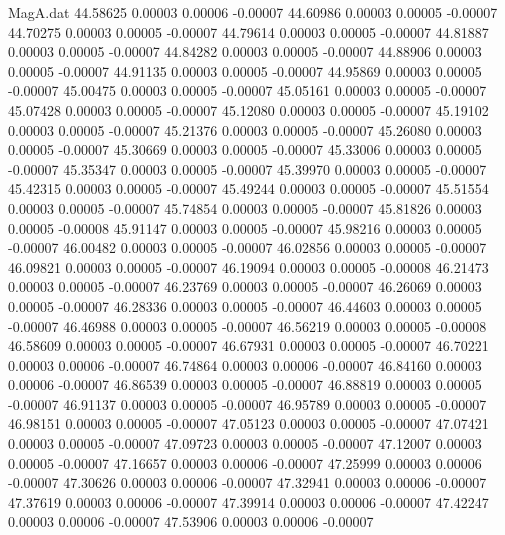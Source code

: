 \begin{filecontents}{MagA.dat}
  44.58625    0.00003    0.00006   -0.00007
  44.60986    0.00003    0.00005   -0.00007
  44.70275    0.00003    0.00005   -0.00007
  44.79614    0.00003    0.00005   -0.00007
  44.81887    0.00003    0.00005   -0.00007
  44.84282    0.00003    0.00005   -0.00007
  44.88906    0.00003    0.00005   -0.00007
  44.91135    0.00003    0.00005   -0.00007
  44.95869    0.00003    0.00005   -0.00007
  45.00475    0.00003    0.00005   -0.00007
  45.05161    0.00003    0.00005   -0.00007
  45.07428    0.00003    0.00005   -0.00007
  45.12080    0.00003    0.00005   -0.00007
  45.19102    0.00003    0.00005   -0.00007
  45.21376    0.00003    0.00005   -0.00007
  45.26080    0.00003    0.00005   -0.00007
  45.30669    0.00003    0.00005   -0.00007
  45.33006    0.00003    0.00005   -0.00007
  45.35347    0.00003    0.00005   -0.00007
  45.39970    0.00003    0.00005   -0.00007
  45.42315    0.00003    0.00005   -0.00007
  45.49244    0.00003    0.00005   -0.00007
  45.51554    0.00003    0.00005   -0.00007
  45.74854    0.00003    0.00005   -0.00007
  45.81826    0.00003    0.00005   -0.00008
  45.91147    0.00003    0.00005   -0.00007
  45.98216    0.00003    0.00005   -0.00007
  46.00482    0.00003    0.00005   -0.00007
  46.02856    0.00003    0.00005   -0.00007
  46.09821    0.00003    0.00005   -0.00007
  46.19094    0.00003    0.00005   -0.00008
  46.21473    0.00003    0.00005   -0.00007
  46.23769    0.00003    0.00005   -0.00007
  46.26069    0.00003    0.00005   -0.00007
  46.28336    0.00003    0.00005   -0.00007
  46.44603    0.00003    0.00005   -0.00007
  46.46988    0.00003    0.00005   -0.00007
  46.56219    0.00003    0.00005   -0.00008
  46.58609    0.00003    0.00005   -0.00007
  46.67931    0.00003    0.00005   -0.00007
  46.70221    0.00003    0.00006   -0.00007
  46.74864    0.00003    0.00006   -0.00007
  46.84160    0.00003    0.00006   -0.00007
  46.86539    0.00003    0.00005   -0.00007
  46.88819    0.00003    0.00005   -0.00007
  46.91137    0.00003    0.00005   -0.00007
  46.95789    0.00003    0.00005   -0.00007
  46.98151    0.00003    0.00005   -0.00007
  47.05123    0.00003    0.00005   -0.00007
  47.07421    0.00003    0.00005   -0.00007
  47.09723    0.00003    0.00005   -0.00007
  47.12007    0.00003    0.00005   -0.00007
  47.16657    0.00003    0.00006   -0.00007
  47.25999    0.00003    0.00006   -0.00007
  47.30626    0.00003    0.00006   -0.00007
  47.32941    0.00003    0.00006   -0.00007
  47.37619    0.00003    0.00006   -0.00007
  47.39914    0.00003    0.00006   -0.00007
  47.42247    0.00003    0.00006   -0.00007
  47.53906    0.00003    0.00006   -0.00007

\end{filecontents}
